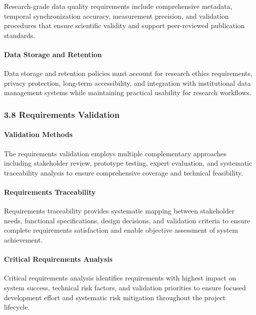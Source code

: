 \documentclass[12pt,a4paper]{report}
\begin{document}
Research-grade data quality requirements include comprehensive metadata, temporal synchronization accuracy, measurement
precision, and validation procedures that ensure scientific validity and support peer-reviewed publication standards.

\paragraph{Data Storage and Retention}

Data storage and retention policies must account for research ethics requirements, privacy protection, long-term
accessibility, and integration with institutional data management systems while maintaining practical usability for
research workflows.

\subsubsection{3.8 Requirements Validation}

\paragraph{Validation Methods}

The requirements validation employs multiple complementary approaches including stakeholder review, prototype testing,
expert evaluation, and systematic traceability analysis to ensure comprehensive coverage and technical feasibility.

\paragraph{Requirements Traceability}

Requirements traceability provides systematic mapping between stakeholder needs, functional specifications, design
decisions, and validation criteria to ensure complete requirements satisfaction and enable objective assessment of
system achievement.

\paragraph{Critical Requirements Analysis}

Critical requirements analysis identifies requirements with highest impact on system success, technical risk factors,
and validation priorities to ensure focused development effort and systematic risk mitigation throughout the project
lifecycle.
\end{document}
